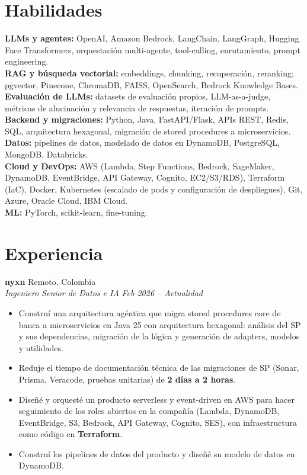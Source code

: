 \documentclass[letterpaper,10pt]{article}
\newcommand{\resumeItem}[1]{\item \small{#1}}
\newcommand{\resumeSubheading}[4]{%
  \textbf{#1} \hfill #2 \\
  \textit{\small #3} \hfill \textit{\small #4} \\
  \vspace{-2pt}
}
\newcommand{\betweenRoles}{\vspace{4pt}}
\begin{document}
\section{Habilidades}
\small
\textbf{LLMs y agentes:} OpenAI, Amazon Bedrock, LangChain, LangGraph, Hugging Face Transformers, orquestación multi-agente, tool-calling, enrutamiento, prompt engineering. \\
\textbf{RAG y búsqueda vectorial:} embeddings, chunking, recuperación, reranking; pgvector, Pinecone, ChromaDB, FAISS, OpenSearch, Bedrock Knowledge Bases. \\
\textbf{Evaluación de LLMs:} datasets de evaluación propios, LLM-as-a-judge, métricas de alucinación y relevancia de respuestas, iteración de prompts. \\
\textbf{Backend y migraciones:} Python, Java, FastAPI/Flask, APIs REST, Redis, SQL, arquitectura hexagonal, migración de stored procedures a microservicios. \\
\textbf{Datos:} pipelines de datos, modelado de datos en DynamoDB, PostgreSQL, MongoDB, Databricks. \\
\textbf{Cloud y DevOps:} AWS (Lambda, Step Functions, Bedrock, SageMaker, DynamoDB, EventBridge, API Gateway, Cognito, EC2/S3/RDS), Terraform (IaC), Docker, Kubernetes (escalado de pods y configuración de despliegues), Git, Azure, Oracle Cloud, IBM Cloud. \\
\textbf{ML:} PyTorch, scikit-learn, fine-tuning. \\

\section{Experiencia}

\resumeSubheading
{nyxn}{Remoto, Colombia}
{Ingeniero Senior de Datos e IA}{Feb 2026 -- Actualidad}
\begin{itemize}
  \resumeItem{Construí una arquitectura agéntica que migra stored procedures core de banca a microservicios en Java 25 con arquitectura hexagonal: análisis del SP y sus dependencias, migración de la lógica y generación de adapters, modelos y utilidades.}
  \resumeItem{Reduje el tiempo de documentación técnica de las migraciones de SP (Sonar, Prisma, Veracode, pruebas unitarias) de \textbf{2 días a 2 horas}.}
  \resumeItem{Diseñé y orquesté un producto serverless y event-driven en AWS para hacer seguimiento de los roles abiertos en la compañía (Lambda, DynamoDB, EventBridge, S3, Bedrock, API Gateway, Cognito, SES), con infraestructura como código en \textbf{Terraform}.}
  \resumeItem{Construí los pipelines de datos del producto y diseñé su modelo de datos en DynamoDB.}
\end{itemize}
\betweenRoles
\end{document}
